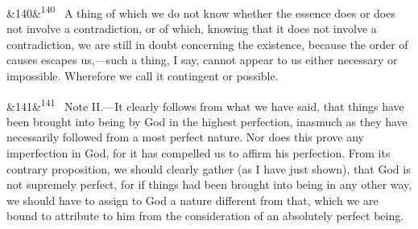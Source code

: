\documentclass[12pt]{article}
\newcommand{\para}[1][]{\par\noindent\ifx&#1&\else\textsuperscript{\footnotesize #1}~\fi}
\begin{document}
\para[140] A thing of which we do not know whether the essence does or does not involve a contradiction, or of which, knowing that it does not involve a contradiction, we are still in doubt concerning the existence, because the order of causes escapes us,---such a thing, I say, cannot appear to us either necessary or impossible. Wherefore we call it contingent or possible.

\para[141] Note II.---It clearly follows from what we have said, that things have been brought into being by God in the highest perfection, inasmuch as they have necessarily followed from a most perfect nature. Nor does this prove any imperfection in God, for it has compelled us to affirm his perfection. From its contrary proposition, we should clearly gather (as I have just shown), that God is not supremely perfect, for if things had been brought into being in any other way, we should have to assign to God a nature different from that, which we are bound to attribute to him from the consideration of an absolutely perfect being.
\end{document}
